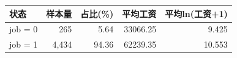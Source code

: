 \begin{tabular}{lrrrr}
\toprule
状态 & 样本量 & 占比(\%) & 平均工资 & 平均ln(工资+1) \\
\midrule
job = 0 & 265 & 5.64 & 33066.25 & 9.425 \\
job = 1 & 4,434 & 94.36 & 62239.35 & 10.553 \\
\bottomrule
\end{tabular}
